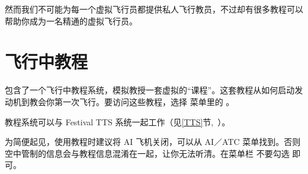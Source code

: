 然而我们不可能为每一个虚拟飞行员都提供私人飞行教员，不过却有很多教程可以帮助你成为一名精通的虚拟飞行员。
\fi
\iffalse
\IfLanguageName{english}{
If you are new to flying, an advanced simulator such as \FlightGear{} can seem
daunting: You are presented with a cockpit of an aircraft with little
information on how to fly it.

In real life, when learning to fly you would have an instructor sitting next to
you to teach you how to fly and keep you safe.

While we cannot provide a personal instructor for every virtual pilot, there are
a number of tutorials available that you can follow to become a proficient
virtual pilot.
}{}
\fi
{}

\ifchinese
\section{飞行中教程}
\fi
\iffalse
\IfLanguageName{english}{
\section{In-flight Tutorials}
}{}
\IfLanguageName{french}{
\section{Tutoriels en vol}
}{}
\fi

\ifchinese
\FlightGear{} 包含了一个飞行中教程系统，模拟教授一套虚拟的“课程”。这套教程从如何启动发动机到教会你第一次飞行。要访问这些教程，选择  菜单里的 。

教程系统可以与 Festival TTS 系统一起工作（见\ref{TTS}节,~）。

为简便起见，使用教程时建议将 AI 飞机关闭，可以从 AI／ATC 菜单找到。否则空中管制的信息会与教程信息混淆在一起，让你无法听清。在菜单栏  不要勾选  即可。

